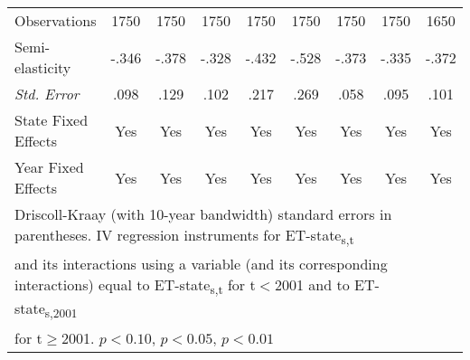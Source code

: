 {\begin{tabular}{l*{8}{c}}
\hline
Observations    &     1750         &     1750         &     1750         &     1750         &     1750         &     1750         &     1750         &     1650         \\
Semi-elasticity            &    -.346         &    -.378         &    -.328         &    -.432         &    -.528         &    -.373         &    -.335         &    -.372         \\
\quad \textit{Std. Error}          &     .098         &     .129         &     .102         &     .217         &     .269         &     .058         &     .095         &     .101         \\
State Fixed Effects         &      Yes         &      Yes         &      Yes         &      Yes         &      Yes         &      Yes         &      Yes         &      Yes         \\
Year Fixed Effects          &      Yes         &      Yes         &      Yes         &      Yes         &      Yes         &      Yes         &      Yes         &      Yes         \\
\hline \hline
\multicolumn{8}{l}{\footnotesize Driscoll-Kraay (with 10-year bandwidth) standard errors in parentheses. IV regression instruments for ET-state\textsubscript{s,t}} \\
\multicolumn{8}{l}{\footnotesize and its interactions using a variable (and its corresponding interactions) equal to ET-state\textsubscript{s,t} for t$<$2001 and to ET-state\textsubscript{s,2001}} \\
\multicolumn{8}{l}{\footnotesize  for t$\geq$2001.  \sym{*} \(p<0.10\), \sym{**} \(p<0.05\), \sym{***} \(p<0.01\)}  \end{tabular} }
